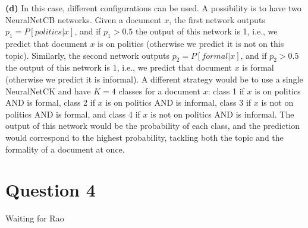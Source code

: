 \documentclass[leqno]{article}
\begin{document}
\hfill

\noindent \textbf{(d)} In this case, different configurations can be used. A possibility is to have two NeuralNetCB networks. Given a document $x$, the first 
network outputs $p_1 = P[politics|x]$, and if $p_1 > 0.5$ the output of this network is 1, i.e., we predict that document $x$ is on politics (otherwise we predict it is not 
on this topic). Similarly, the 
second network outputs $p_2 = P[formal|x]$, and if $p_2 > 0.5$ the output of this network is 1, i.e., we predict that document $x$ is formal (otherwise we predict it is 
informal). A different strategy would be to use a single NeuralNetCK and have $K = 4$ classes for a document $x$: class 1 if $x$ is on politics AND is formal, 
class 2 if $x$ is on politics AND is informal, class 3 if $x$ is not on politics AND is formal, and class 4 if $x$ is not on politics AND is informal. The output of this 
network would be the probability of each class, and the prediction would correspond to the highest probability, tackling both the topic and the formality of a document at 
once. 

\hfill

\section*{Question 4} Waiting for Rao
\end{document}
